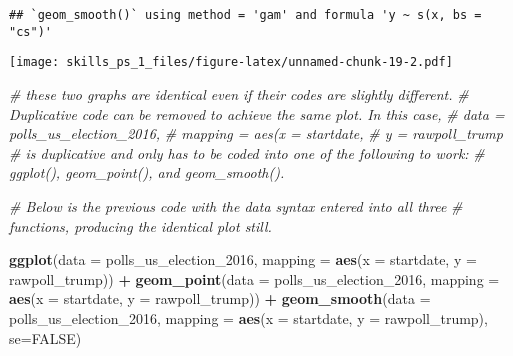 \documentclass[
]{article}
\newenvironment{Shaded}{\begin{snugshade}}{\end{snugshade}}
\newcommand{\CommentTok}[1]{\textcolor[rgb]{0.56,0.35,0.01}{\textit{#1}}}
\newcommand{\DataTypeTok}[1]{\textcolor[rgb]{0.13,0.29,0.53}{#1}}
\newcommand{\DecValTok}[1]{\textcolor[rgb]{0.00,0.00,0.81}{#1}}
\newcommand{\KeywordTok}[1]{\textcolor[rgb]{0.13,0.29,0.53}{\textbf{#1}}}
\newcommand{\NormalTok}[1]{#1}
\newcommand{\OperatorTok}[1]{\textcolor[rgb]{0.81,0.36,0.00}{\textbf{#1}}}
\newcommand{\OtherTok}[1]{\textcolor[rgb]{0.56,0.35,0.01}{#1}}
\newcommand{\StringTok}[1]{\textcolor[rgb]{0.31,0.60,0.02}{#1}}
\begin{document}
\begin{enumerate}
\begin{verbatim}
## `geom_smooth()` using method = 'gam' and formula 'y ~ s(x, bs = "cs")'
\end{verbatim}

  \texttt{[image: skills\_ps\_1\_files/figure-latex/unnamed-chunk-19-2.pdf]}

\begin{Shaded}
\begin{Highlighting}[]
\CommentTok{# these two graphs are identical even if their codes are slightly different.}
\CommentTok{# Duplicative code can be removed to achieve the same plot. In this case,}
\CommentTok{# data = polls_us_election_2016, }
\CommentTok{#              mapping = aes(x = startdate, }
\CommentTok{#                            y = rawpoll_trump}
\CommentTok{# is duplicative and only has to be coded into one of the following to work:}
\CommentTok{# ggplot(), geom_point(), and geom_smooth().}
\end{Highlighting}
\end{Shaded}
\end{enumerate}

\begin{Shaded}
\begin{Highlighting}[]
\CommentTok{# Below is the previous code with the data syntax entered into all three }
\CommentTok{# functions, producing the identical plot still.}

 \KeywordTok{ggplot}\NormalTok{(}\DataTypeTok{data =}\NormalTok{ polls_us_election_}\DecValTok{2016}\NormalTok{, }
                 \DataTypeTok{mapping =} \KeywordTok{aes}\NormalTok{(}\DataTypeTok{x =}\NormalTok{ startdate, }
                               \DataTypeTok{y =}\NormalTok{ rawpoll_trump)) }\OperatorTok{+}
\StringTok{      }\KeywordTok{geom_point}\NormalTok{(}\DataTypeTok{data =}\NormalTok{ polls_us_election_}\DecValTok{2016}\NormalTok{, }
                 \DataTypeTok{mapping =} \KeywordTok{aes}\NormalTok{(}\DataTypeTok{x =}\NormalTok{ startdate, }
                               \DataTypeTok{y =}\NormalTok{ rawpoll_trump)) }\OperatorTok{+}
\StringTok{      }\KeywordTok{geom_smooth}\NormalTok{(}\DataTypeTok{data =}\NormalTok{ polls_us_election_}\DecValTok{2016}\NormalTok{, }
                  \DataTypeTok{mapping =} \KeywordTok{aes}\NormalTok{(}\DataTypeTok{x =}\NormalTok{ startdate, }
                                \DataTypeTok{y =}\NormalTok{ rawpoll_trump), }\DataTypeTok{se=}\OtherTok{FALSE}\NormalTok{)}
\end{Highlighting}
\end{Shaded}
\end{document}

